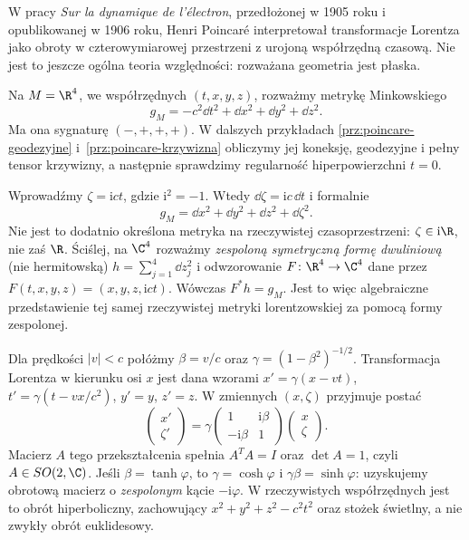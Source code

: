 
\begin{przyklad}
\label{prz:poincare-czas-urojony}
W pracy \emph{Sur la dynamique de l'électron}, przedłożonej
w 1905 roku i opublikowanej w 1906 roku, Henri Poincaré
interpretował transformacje Lorentza jako obroty
w czterowymiarowej przestrzeni z urojoną współrzędną
czasową. Nie jest to jeszcze ogólna teoria względności:
rozważana geometria jest płaska.

Na $M=\R^4$, we współrzędnych $(t,x,y,z)$, rozważmy
metrykę Minkowskiego
\begin{equation}\label{eq:poincare-minkowski}
 g_M=-c^2\dd t^2+\dd x^2+\dd y^2+\dd z^2.
\end{equation}
Ma ona sygnaturę $(-,+,+,+)$. W dalszych przykładach
\ref{prz:poincare-geodezyjne} i~\ref{prz:poincare-krzywizna}
obliczymy jej koneksję, geodezyjne i pełny tensor
krzywizny, a następnie sprawdzimy regularność
hiperpowierzchni $t=0$.

Wprowadźmy $\zeta=\mathrm{i}ct$, gdzie $\mathrm{i}^2=-1$.
Wtedy $\dd\zeta=\mathrm{i}c\,\dd t$ i formalnie
\begin{equation}\label{eq:poincare-complex-metric}
 g_M=\dd x^2+\dd y^2+\dd z^2+\dd\zeta^2.
\end{equation}
Nie jest to dodatnio określona metryka na rzeczywistej
czasoprzestrzeni: $\zeta\in\mathrm{i}\R$, nie zaś
$\R$. Ściślej, na $\C^4$ rozważmy \emph{zespoloną
symetryczną formę dwuliniową} (nie hermitowską)
$h=\sum_{j=1}^4\dd z_j^2$ i odwzorowanie
$F\colon\R^4\to\C^4$ dane przez
$F(t,x,y,z)=(x,y,z,\mathrm{i}ct)$.
Wówczas $F^*h=g_M$. Jest to więc algebraiczne
przedstawienie tej samej rzeczywistej metryki
lorentzowskiej za pomocą formy zespolonej.

Dla prędkości $|v|<c$ połóżmy $\beta=v/c$ oraz
$\gamma=(1-\beta^2)^{-1/2}$. Transformacja Lorentza
w kierunku osi $x$ jest dana wzorami
$x'=\gamma(x-vt)$,
$t'=\gamma(t-vx/c^2)$, $y'=y$, $z'=z$.
W zmiennych $(x,\zeta)$ przyjmuje postać
\begin{equation}\label{eq:poincare-complex-boost}
 \begin{pmatrix}x'\\\zeta'\end{pmatrix}
 =\gamma\begin{pmatrix}
  1&\mathrm{i}\beta\\-\mathrm{i}\beta&1
 \end{pmatrix}
 \begin{pmatrix}x\\\zeta\end{pmatrix}.
\end{equation}
Macierz $A$ tego przekształcenia spełnia
$A^TA=I$ oraz $\det A=1$, czyli $A\in SO(2,\C)$.
Jeśli $\beta=\tanh\varphi$, to
$\gamma=\cosh\varphi$ i $\gamma\beta=\sinh\varphi$:
uzyskujemy obrotową macierz o \emph{zespolonym}
kącie $-\mathrm{i}\varphi$. W rzeczywistych
współrzędnych jest to obrót hiperboliczny, zachowujący
$x^2+y^2+z^2-c^2t^2$ oraz stożek świetlny,
a nie zwykły obrót euklidesowy.


\end{przyklad}
